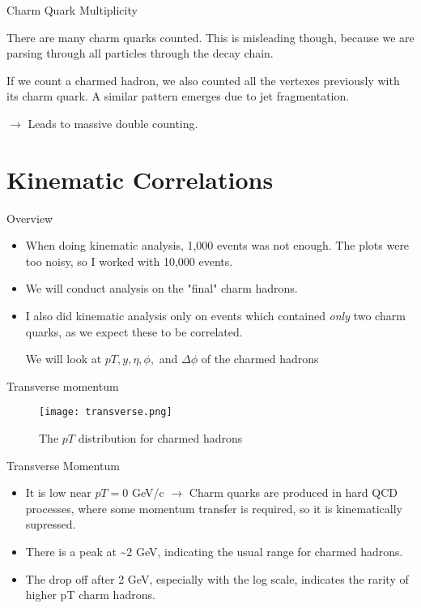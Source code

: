 \documentclass[10pt]{beamer}
\begin{document}
\begin{frame}{Charm Quark Multiplicity}

There are many charm quarks counted. This is misleading though, because we are parsing through all particles through the decay chain. 

If we count a charmed hadron, we also counted all the vertexes previously with its charm quark. A similar pattern emerges due to jet fragmentation.

$\rightarrow$ Leads to massive double counting.
    
\end{frame}

\section{Kinematic Correlations}

\begin{frame}{Overview}

\begin{itemize}
    \item When doing kinematic analysis, 1,000 events was not enough. The plots were too noisy, so I worked with 10,000 events. 
    \item We will conduct analysis on the "final" charm hadrons.
    \item I also did kinematic analysis only on events which contained \textit{only }two charm quarks, as we expect these to be correlated.

\vspace{1em}
We will look at $pT, y, \eta, \phi,$ and $\Delta\phi$ of the charmed hadrons
\end{itemize}

\end{frame}

\begin{frame}{Transverse momentum}
\begin{figure}
    \centering
    \texttt{[image: transverse.png]}
    \caption{The $pT$ distribution for charmed hadrons}
    \label{fig:transverse}
\end{figure}
\end{frame}

\begin{frame}{Transverse Momentum}

\begin{itemize}
    \item It is low near $pT=0$ GeV/c $\rightarrow$ Charm quarks are produced in hard QCD processes, where some momentum transfer is required, so it is kinematically supressed.
    \item There is a peak at \textasciitilde 2 GeV, indicating the usual range for charmed hadrons.
    \item The drop off after 2 GeV, especially with the log scale, indicates the rarity of higher pT charm hadrons.
\end{itemize}
\end{frame}
\end{document}
